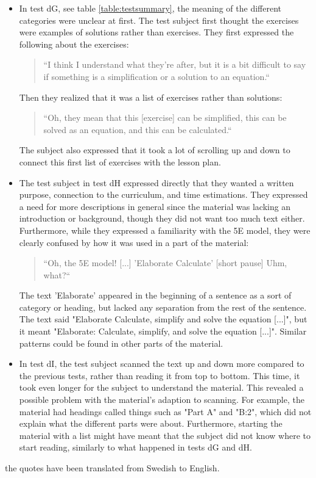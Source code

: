 \begin{itemize}
  \item In test dG, see table \ref{table:testsummary}, the meaning of the different categories were unclear at first. The test subject first thought the exercises were examples of solutions rather than exercises. They first expressed the following about the exercises:
		\begin{quote}
			“I think I understand what they're after, but it is a bit difficult to say if something is a simplification or a solution to an equation.“
		\end{quote}
		Then they realized that it was a list of exercises rather than solutions:
		\begin{quote}
			“Oh, they mean that this [exercise] can be simplified, this can be solved as an equation, and this can be calculated.“
		\end{quote}
		The subject also expressed that it took a lot of scrolling up and down to connect this first list of exercises with the lesson plan.
  \item The test subject in test dH expressed directly that they wanted a written purpose, connection to the curriculum, and time estimations. They expressed a need for more descriptions in general since the material was lacking an introduction or background, though they did not want too much text either. Furthermore, while they expressed a familiarity with the 5E model, they were clearly confused by how it was used in a part of the material:
		\begin{quote}
			“Oh, the 5E model! [...] 'Elaborate Calculate' [short pause] Uhm, what?“
		\end{quote}
		The text 'Elaborate' appeared in the beginning of a sentence as a sort of category or heading, but lacked any separation from the rest of the sentence. The text said "Elaborate Calculate, simplify and solve the equation [...]", but it meant "Elaborate: Calculate, simplify, and solve the equation [...]". Similar patterns could be found in other parts of the material.
  \item In test dI, the test subject scanned the text up and down more compared to the previous tests, rather than reading it from top to bottom. This time, it took even longer for the subject to understand the material. This revealed a possible problem with the material's adaption to scanning. For example, the material had headings called things such as "Part A" and "B:2", which did not explain what the different parts were about. Furthermore, starting the material with a list might have meant that the subject did not know where to start reading, similarly to what happened in tests dG and dH.
\end{itemize}
 the quotes have been translated from Swedish to English.
\vspace{-1cm}

